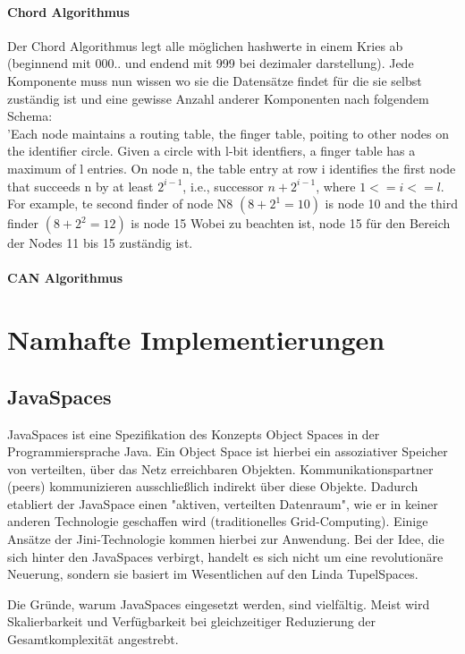 \documentclass[a4paper,12pt]{scrreprt}
\begin{document}
				\subsubsection{Chord Algorithmus}
					
					Der Chord Algorithmus legt alle möglichen hashwerte in einem Kries ab (beginnend mit 000.. und endend mit 999 bei dezimaler darstellung). Jede Komponente muss nun wissen wo sie die Datensätze findet für die sie selbst zuständig ist und eine gewisse Anzahl anderer Komponenten nach folgendem Schema:\\
					'Each node maintains a routing table, the finger table, poiting to other nodes on the identifier circle. Given a circle with l-bit identfiers, a finger table has a maximum of l entries. On node n, the table entry at row i identifies the first node that succeeds n by at least $2^{i-1}$, i.e., successor $n+{2}^{i-1}$, where $1 <= i <= l$. For example, te second finder of node N8 $(8+2^1=10)$ is node 10 and the third finder $(8+2^2=12)$ is node 15 Wobei zu beachten ist, node 15 für den Bereich der Nodes 11 bis 15 zuständig ist. %
					
					
				\subsubsection{CAN Algorithmus}
	
\chapter{Namhafte Implementierungen}
	\section{JavaSpaces}
		JavaSpaces ist eine Spezifikation des Konzepts Object Spaces in der Programmiersprache Java. Ein Object Space ist hierbei ein assoziativer Speicher von verteilten, über das Netz erreichbaren Objekten. Kommunikationspartner (peers) kommunizieren ausschließlich indirekt über diese Objekte. Dadurch etabliert der JavaSpace einen "aktiven, verteilten Datenraum", wie er in keiner anderen Technologie geschaffen wird (traditionelles Grid-Computing). Einige Ansätze der Jini-Technologie kommen hierbei zur Anwendung. Bei der Idee, die sich hinter den JavaSpaces verbirgt, handelt es sich nicht um eine revolutionäre Neuerung, sondern sie basiert im Wesentlichen auf den Linda TupelSpaces.
		
		Die Gründe, warum JavaSpaces eingesetzt werden, sind vielfältig. Meist wird Skalierbarkeit und Verfügbarkeit bei gleichzeitiger Reduzierung der Gesamtkomplexität angestrebt.
		
\end{document}
